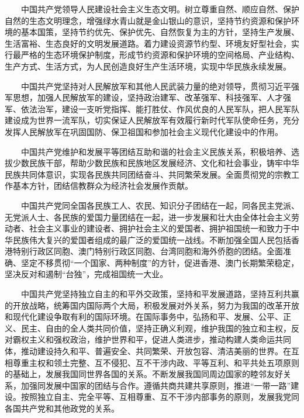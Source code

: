　　中国共产党领导人民建设社会主义生态文明。树立尊重自然、顺应自然、保护自然的生态文明理念，增强绿水青山就是金山银山的意识，坚持节约资源和保护环境的基本国策，坚持节约优先、保护优先、自然恢复为主的方针，坚持生产发展、生活富裕、生态良好的文明发展道路。着力建设资源节约型、环境友好型社会，实行最严格的生态环境保护制度，形成节约资源和保护环境的空间格局、产业结构、生产方式、生活方式，为人民创造良好生产生活环境，实现中华民族永续发展。

　　中国共产党坚持对人民解放军和其他人民武装力量的绝对领导，贯彻习近平强军思想，加强人民解放军的建设，坚持政治建军、改革强军、科技强军、人才强军、依法治军，建设一支听党指挥、能打胜仗、作风优良的人民军队，把人民军队建设成为世界一流军队，切实保证人民解放军有效履行新时代军队使命任务，充分发挥人民解放军在巩固国防、保卫祖国和参加社会主义现代化建设中的作用。

　　中国共产党维护和发展平等团结互助和谐的社会主义民族关系，积极培养、选拔少数民族干部，帮助少数民族和民族地区发展经济、文化和社会事业，铸牢中华民族共同体意识，实现各民族共同团结奋斗、共同繁荣发展。全面贯彻党的宗教工作基本方针，团结信教群众为经济社会发展作贡献。

　　中国共产党同全国各民族工人、农民、知识分子团结在一起，同各民主党派、无党派人士、各民族的爱国力量团结在一起，进一步发展和壮大由全体社会主义劳动者、社会主义事业的建设者、拥护社会主义的爱国者、拥护祖国统一和致力于中华民族伟大复兴的爱国者组成的最广泛的爱国统一战线。不断加强全国人民包括香港特别行政区同胞、澳门特别行政区同胞、台湾同胞和海外侨胞的团结。全面准确、坚定不移贯彻“一个国家、两种制度”的方针，促进香港、澳门长期繁荣稳定，坚决反对和遏制“台独”，完成祖国统一大业。

　　中国共产党坚持独立自主的和平外交政策，坚持和平发展道路，坚持互利共赢的开放战略，统筹国内国际两个大局，积极发展对外关系，努力为我国的改革开放和现代化建设争取有利的国际环境。在国际事务中，弘扬和平、发展、公平、正义、民主、自由的全人类共同价值，坚持正确义利观，维护我国的独立和主权，反对霸权主义和强权政治，维护世界和平，促进人类进步，推动构建人类命运共同体，推动建设持久和平、普遍安全、共同繁荣、开放包容、清洁美丽的世界。在互相尊重主权和领土完整、互不侵犯、互不干涉内政、平等互利、和平共处五项原则的基础上，发展我国同世界各国的关系。不断发展我国同周边国家的睦邻友好关系，加强同发展中国家的团结与合作。遵循共商共建共享原则，推进“一带一路”建设。按照独立自主、完全平等、互相尊重、互不干涉内部事务的原则，发展我党同各国共产党和其他政党的关系。

